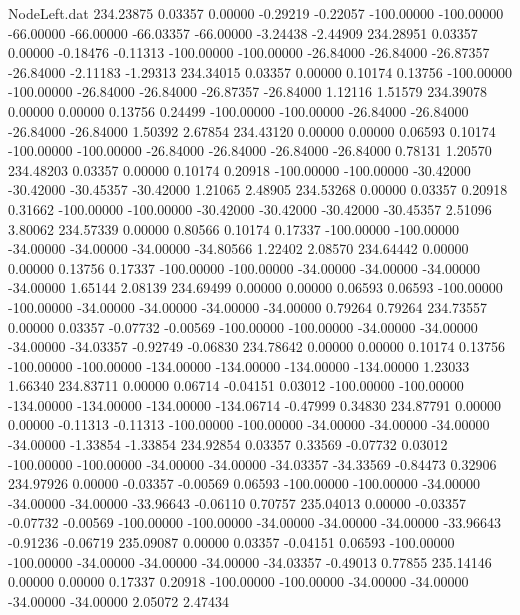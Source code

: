 \begin{filecontents}{NodeLeft.dat}
 234.23875    0.03357    0.00000    -0.29219   -0.22057 -100.00000 -100.00000  -66.00000  -66.00000  -66.03357  -66.00000   -3.24438   -2.44909
 234.28951    0.03357    0.00000    -0.18476   -0.11313 -100.00000 -100.00000  -26.84000  -26.84000  -26.87357  -26.84000   -2.11183   -1.29313
 234.34015    0.03357    0.00000     0.10174    0.13756 -100.00000 -100.00000  -26.84000  -26.84000  -26.87357  -26.84000    1.12116    1.51579
 234.39078    0.00000    0.00000     0.13756    0.24499 -100.00000 -100.00000  -26.84000  -26.84000  -26.84000  -26.84000    1.50392    2.67854
 234.43120    0.00000    0.00000     0.06593    0.10174 -100.00000 -100.00000  -26.84000  -26.84000  -26.84000  -26.84000    0.78131    1.20570
 234.48203    0.03357    0.00000     0.10174    0.20918 -100.00000 -100.00000  -30.42000  -30.42000  -30.45357  -30.42000    1.21065    2.48905
 234.53268    0.00000    0.03357     0.20918    0.31662 -100.00000 -100.00000  -30.42000  -30.42000  -30.42000  -30.45357    2.51096    3.80062
 234.57339    0.00000    0.80566     0.10174    0.17337 -100.00000 -100.00000  -34.00000  -34.00000  -34.00000  -34.80566    1.22402    2.08570
 234.64442    0.00000    0.00000     0.13756    0.17337 -100.00000 -100.00000  -34.00000  -34.00000  -34.00000  -34.00000    1.65144    2.08139
 234.69499    0.00000    0.00000     0.06593    0.06593 -100.00000 -100.00000  -34.00000  -34.00000  -34.00000  -34.00000    0.79264    0.79264
 234.73557    0.00000    0.03357    -0.07732   -0.00569 -100.00000 -100.00000  -34.00000  -34.00000  -34.00000  -34.03357   -0.92749   -0.06830
 234.78642    0.00000    0.00000     0.10174    0.13756 -100.00000 -100.00000 -134.00000 -134.00000 -134.00000 -134.00000    1.23033    1.66340
 234.83711    0.00000    0.06714    -0.04151    0.03012 -100.00000 -100.00000 -134.00000 -134.00000 -134.00000 -134.06714   -0.47999    0.34830
 234.87791    0.00000    0.00000    -0.11313   -0.11313 -100.00000 -100.00000  -34.00000  -34.00000  -34.00000  -34.00000   -1.33854   -1.33854
 234.92854    0.03357    0.33569    -0.07732    0.03012 -100.00000 -100.00000  -34.00000  -34.00000  -34.03357  -34.33569   -0.84473    0.32906
 234.97926    0.00000   -0.03357    -0.00569    0.06593 -100.00000 -100.00000  -34.00000  -34.00000  -34.00000  -33.96643   -0.06110    0.70757
 235.04013    0.00000   -0.03357    -0.07732   -0.00569 -100.00000 -100.00000  -34.00000  -34.00000  -34.00000  -33.96643   -0.91236   -0.06719
 235.09087    0.00000    0.03357    -0.04151    0.06593 -100.00000 -100.00000  -34.00000  -34.00000  -34.00000  -34.03357   -0.49013    0.77855
 235.14146    0.00000    0.00000     0.17337    0.20918 -100.00000 -100.00000  -34.00000  -34.00000  -34.00000  -34.00000    2.05072    2.47434

\end{filecontents}
